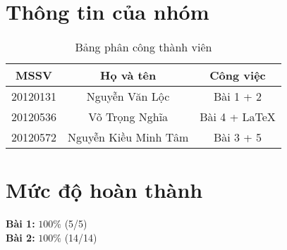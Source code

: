 \section{Thông tin của nhóm}
\begin{table}[H]
\begin{center}
\begin{tabular}{|c|c|c|}
\hline 
MSSV & Họ và tên & Công việc \\ 
\hline 
20120131 & Nguyễn Văn Lộc & Bài 1 + 2 \\ 
\hline 
20120536 & Võ Trọng Nghĩa & Bài 4 + \LaTeX \\ 
\hline 
20120572 & Nguyễn Kiều Minh Tâm & Bài 3 + 5 \\ 
\hline 
\end{tabular}
\caption{Bảng phân công thành viên} 
\end{center}
\end{table}

\section{Mức độ hoàn thành}
\textbf{Bài 1:} $100\%$ (5/5)\\
\textbf{Bài 2:} $100\%$ (14/14)